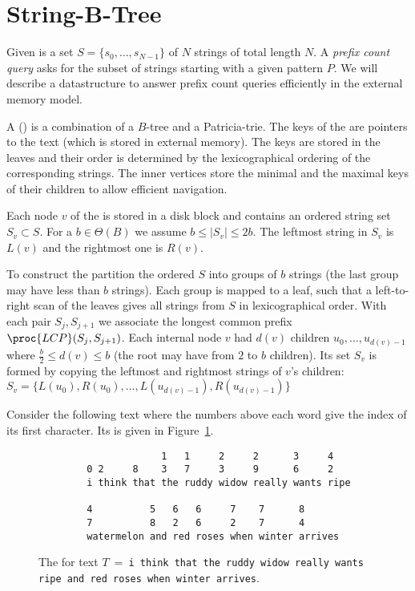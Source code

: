 \section{String-B-Tree}

Given is a set $S = \{s_0, \ldots, s_{N - 1}\}$ of $N$ strings of total length $N$. A \emph{prefix count query} asks for the subset of strings starting with a given pattern $P$. We will describe a datastructure to answer prefix count queries efficiently in the external memory model.

\begin{Definition}
  A  () is a combination of a $B$-tree and a Patricia-trie. The keys of the  are pointers to the text (which is stored in external memory). The keys are stored in the leaves and their order is determined by the lexicographical ordering of the corresponding strings. The inner vertices store the minimal and the maximal keys of their children to allow efficient navigation.
\end{Definition}

Each node $v$ of the  is stored in a disk block and contains an ordered string set $S_v \subset S$. For a $b \in \Theta(B)$ we assume $b \leq \vert S_v \vert \leq 2b$. The leftmost string in $S_v$ is $L(v)$ and the rightmost one is $R(v)$.

To construct the  partition the ordered $S$ into groups of $b$ strings (the last group may have less than $b$ strings). Each group is mapped to a leaf, such that a left-to-right scan of the leaves gives all strings from $S$ in lexicographical order. With each pair $S_j, S_{j+1}$ we associate the longest common prefix $\proc{LCP}(S_j, S_{j+1})$. Each internal node $v$ had $d(v)$ children $u_0, \ldots, u_{d(v) - 1}$ where $\frac{b}{2} \leq d(v) \leq b$ (the root may have from $2$ to $b$ children). Its set $S_v$ is formed by copying the leftmost and rightmost strings of $v$'s children: $S_v = \{L(u_0), R(u_0), \ldots, L(u_{d(v) - 1}), R(u_{d(v) - 1})\}$

\begin{Example}
  Consider the following text where the numbers above each word give the index of its first character. Its  is given in Figure~\ref{fig:stringBTree}.
  \begin{verbatim}
                           1   1     2     2      3     4
              0 2     8    3   7     3     9      6     2
              i think that the ruddy widow really wants ripe

              4          5   6   6     7    7      8
              7          8   2   6     2    7      4
              watermelon and red roses when winter arrives
  \end{verbatim}

  \begin{figure}[htb]
    \centering
    
    \caption{The  for text $T~=~$\texttt{i think that the ruddy widow really wants ripe and red roses when winter arrives}.}
    \label{fig:stringBTree}
  \end{figure}
\end{Example}

